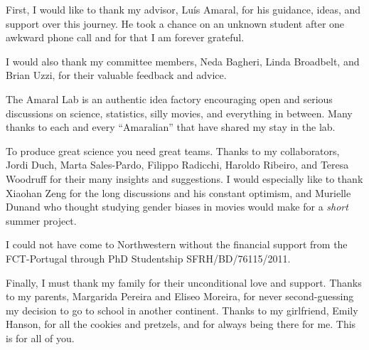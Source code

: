 First, I would like to thank my advisor, Lu\'{i}s Amaral, for his guidance, ideas, and support over this journey. He took a chance on an unknown student after one awkward phone call and for that I am forever grateful.

I would also thank my committee members, Neda Bagheri, Linda Broadbelt, and Brian Uzzi, for their valuable feedback and advice.

The Amaral Lab is an authentic idea factory encouraging open and serious discussions on science, statistics, silly movies, and everything in between. Many thanks to each and every ``Amaralian'' that have shared my stay in the lab.

To produce great science you need great teams. Thanks to my collaborators, Jordi Duch, Marta Sales-Pardo, Filippo Radicchi, Haroldo Ribeiro, and Teresa Woodruff for their many insights and suggestions. I would especially like to thank Xiaohan Zeng for the long discussions and his constant optimism, and Murielle Dunand who thought studying gender biases in movies would make for a \textit{short} summer project.

I could not have come to Northwestern without the financial support from the FCT-Portugal through PhD Studentship SFRH/BD/76115/2011.

Finally, I must thank my family for their unconditional love and support. Thanks to my parents, Margarida Pereira and Eliseo Moreira, for never second-guessing my decision to go to school in another continent. Thanks to my girlfriend, Emily Hanson, for all the cookies and pretzels, and for always being there for me. This is for all of you.
